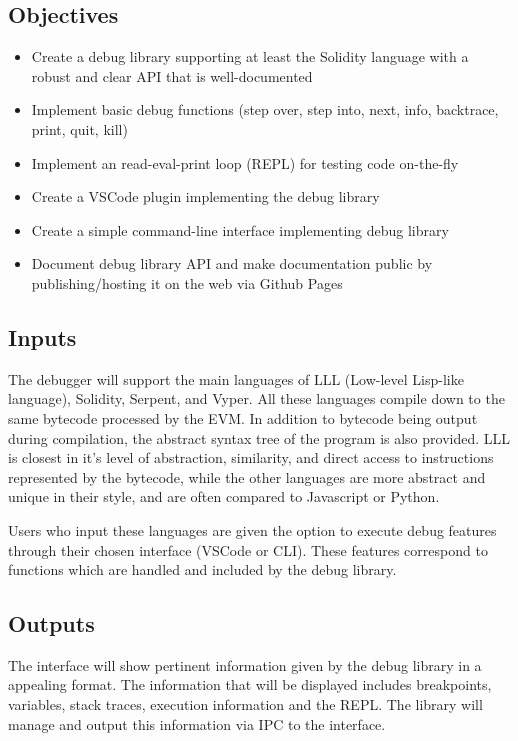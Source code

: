 \documentclass[]{article}
\begin{document}
\subsection{Objectives}
\begin{itemize}
	\item Create a debug library supporting at least the Solidity language with a robust and clear API that is well-documented
	\item Implement basic debug functions (step over, step into, next, info, backtrace, print, quit, kill)
	\item Implement an read-eval-print loop (REPL) for testing code on-the-fly
	\item Create a VSCode plugin implementing the debug library
	\item Create a simple command-line interface implementing debug library
	\item Document debug library API and make documentation public by publishing/hosting it on the web via Github Pages
\end{itemize}

\subsection{Inputs}
The debugger will support the main languages of LLL (Low-level Lisp-like language), Solidity, Serpent, and Vyper. All these languages compile down to the same bytecode processed by the EVM. In addition to bytecode being output during compilation, the abstract syntax tree of the program is also provided. LLL is closest in it's level of abstraction, similarity, and direct access to instructions represented by the bytecode, while the other languages are more abstract and unique in their style, and are often compared to Javascript or Python.

Users who input these languages are given the option to execute debug features through their chosen interface (VSCode or CLI). These features correspond to functions which are handled and included by the debug library.

\subsection{Outputs}
The interface will show pertinent information given by the debug library in a appealing format. The information that will be displayed includes breakpoints, variables, stack traces, execution information and the REPL. The library will manage and output this information via IPC to the interface.
\end{document}
